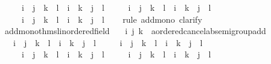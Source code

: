 \begin{isabellebody}
\ \ \ \ \ {\isachardoublequoteopen}i\ {\isacharequal}{\kern0pt}\ j\ {\isasymand}\ k\ {\isasymle}\ l\ {\isasymLongrightarrow}\ i\ {\isacharplus}{\kern0pt}\ k\ {\isasymle}\ j\ {\isacharplus}{\kern0pt}\ l{\isachardoublequoteclose}\isanewline
\ \ \ \ \ {\isachardoublequoteopen}i\ {\isasymle}\ j\ {\isasymand}\ k\ {\isacharequal}{\kern0pt}\ l\ {\isasymLongrightarrow}\ i\ {\isacharplus}{\kern0pt}\ k\ {\isasymle}\ j\ {\isacharplus}{\kern0pt}\ l{\isachardoublequoteclose}\isanewline
\ \ \ \ \ {\isachardoublequoteopen}i\ {\isacharequal}{\kern0pt}\ j\ {\isasymand}\ k\ {\isacharequal}{\kern0pt}\ l\ {\isasymLongrightarrow}\ i\ {\isacharplus}{\kern0pt}\ k\ {\isacharequal}{\kern0pt}\ j\ {\isacharplus}{\kern0pt}\ l{\isachardoublequoteclose}\isanewline
%
\isadelimproof
\ \ %
\endisadelimproof
%
\isatagproof
{}\isamarkupfalse%
\ {\isacharparenleft}{\kern0pt}rule\ add{\isacharunderscore}{\kern0pt}mono{\isacharcomma}{\kern0pt}\ clarify{\isacharplus}{\kern0pt}{\isacharparenright}{\kern0pt}{\isacharplus}{\kern0pt}%
\endisatagproof
{\isafoldproof}%
%
\isadelimproof
\isanewline
%
\endisadelimproof
\isanewline
{}\isamarkupfalse%
\ add{\isacharunderscore}{\kern0pt}mono{\isacharunderscore}{\kern0pt}thms{\isacharunderscore}{\kern0pt}linordered{\isacharunderscore}{\kern0pt}field{\isacharcolon}{\kern0pt}\isanewline
\ \ \ i\ j\ k\ {\isacharcolon}{\kern0pt}{\isacharcolon}{\kern0pt}\ {\isachardoublequoteopen}{\isacharprime}{\kern0pt}a{\isacharcolon}{\kern0pt}{\isacharcolon}{\kern0pt}ordered{\isacharunderscore}{\kern0pt}cancel{\isacharunderscore}{\kern0pt}ab{\isacharunderscore}{\kern0pt}semigroup{\isacharunderscore}{\kern0pt}add{\isachardoublequoteclose}\isanewline
\ \ \ {\isachardoublequoteopen}i\ {\isacharless}{\kern0pt}\ j\ {\isasymand}\ k\ {\isacharequal}{\kern0pt}\ l\ {\isasymLongrightarrow}\ i\ {\isacharplus}{\kern0pt}\ k\ {\isacharless}{\kern0pt}\ j\ {\isacharplus}{\kern0pt}\ l{\isachardoublequoteclose}\isanewline
\ \ \ \ \ {\isachardoublequoteopen}i\ {\isacharequal}{\kern0pt}\ j\ {\isasymand}\ k\ {\isacharless}{\kern0pt}\ l\ {\isasymLongrightarrow}\ i\ {\isacharplus}{\kern0pt}\ k\ {\isacharless}{\kern0pt}\ j\ {\isacharplus}{\kern0pt}\ l{\isachardoublequoteclose}\isanewline
\ \ \ \ \ {\isachardoublequoteopen}i\ {\isacharless}{\kern0pt}\ j\ {\isasymand}\ k\ {\isasymle}\ l\ {\isasymLongrightarrow}\ i\ {\isacharplus}{\kern0pt}\ k\ {\isacharless}{\kern0pt}\ j\ {\isacharplus}{\kern0pt}\ l{\isachardoublequoteclose}\isanewline
\ \ \ \ \ {\isachardoublequoteopen}i\ {\isasymle}\ j\ {\isasymand}\ k\ {\isacharless}{\kern0pt}\ l\ {\isasymLongrightarrow}\ i\ {\isacharplus}{\kern0pt}\ k\ {\isacharless}{\kern0pt}\ j\ {\isacharplus}{\kern0pt}\ l{\isachardoublequoteclose}\isanewline

\end{isabellebody}
